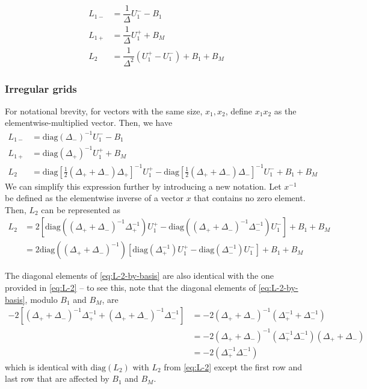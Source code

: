 \documentclass[11pt]{article}
\begin{document}
\begin{align}
L_{1-} &= \dfrac{1}{\Delta} U_1^{-} - B_1 \\
L_{1+} &= \dfrac{1}{\Delta} U_1^{+} + B_{M} \\
L_2 &= \dfrac{1}{\Delta^2} (U_1^+ - U_1^-) + B_1 + B_{M}
\end{align}

\subsubsection{Irregular grids}
For notational brevity, for vectors with the same size, $x_1, x_2$, define $x_1 x_2$ as the elementwise-multiplied vector. Then, we have
\begin{align}
L_{1-} &= \text{diag}(\Delta_{-} )^{-1} U_1^{-} - B_1 \\
L_{1+} &= \text{diag}(\Delta_{+} )^{-1} U_1^{+} + B_{M} \\
L_2 &= \text{diag} \left[ \frac{1}{2} ( \Delta_+ + \Delta_- ) \Delta_+ \right]^{-1}  U_1^{+} - 
 \text{diag} \left[ \frac{1}{2} ( \Delta_+ + \Delta_- ) \Delta_- \right]^{-1}  U_1^{-} 
+ B_1 + B_{M} 
\end{align}
We can simplify this expression further by introducing a new notation. Let $x^{-1}$ be defined as the elementwise inverse of a vector $x$ that contains no zero element. Then, $L_2$ can be represented as
\begin{align}
L_2 &=
2\left[ \text{diag} \left( ( \Delta_+ + \Delta_- )^{-1} \Delta_+^{-1} \right) U_1^{+} - 
\text{diag} \left( ( \Delta_+ + \Delta_- )^{-1} \Delta_-^{-1} \right) U_1^{-}  \right]
+ B_1 + B_{M} \\ \label{eq:L-2-by-basis}
&= 2 \text{diag} \left( ( \Delta_+ + \Delta_- )^{-1} \right) \left[ \text{diag} \left(  \Delta_+^{-1} \right) U_1^{+} - 
\text{diag} \left(  \Delta_-^{-1} \right) U_1^{-}  \right]
+ B_1 + B_{M}
\end{align}


The diagonal elements of \eqref{eq:L-2-by-basis} are also identical with the one provided in \eqref{eq:L-2} -- to see this, note that the diagonal elements of \eqref{eq:L-2-by-basis}, modulo $B_1$ and $B_{M}$, are
\begin{align}
-2 \left[ (\Delta_+ + \Delta_-)^{-1} \Delta_+^{-1} + (\Delta_+ + \Delta_-)^{-1} \Delta_-^{-1} \right] &= -2 (\Delta_+ + \Delta_-)^{-1}  ( \Delta_+^{-1} + \Delta_-^{-1} ) \\
&= -2(\Delta_+ + \Delta_-)^{-1} (\Delta_+^{-1} \Delta_-^{-1}) (\Delta_+ + \Delta_- )  \\
&= -2 (\Delta_+^{-1} \Delta_-^{-1})
\end{align}
which is identical with $\text{diag} (L_2)$ with $L_2$ from \eqref{eq:L-2} except the first row and last row that are affected by $B_1$ and $B_{M}$.
\end{document}

